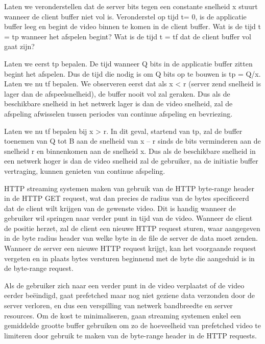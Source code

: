
\noindent Laten we veronderstellen dat de server bits tegen een constante snelheid x stuurt wanneer de client buffer niet vol is. Veronderstel op tijd t= 0, is de applicatie buffer leeg en begint de video binnen te komen in de client buffer. Wat is de tijd t = tp wanneer het afspelen begint? Wat is de tijd t = tf dat de client buffer vol gaat zijn?

\noindent Laten we eerst tp bepalen. De tijd wanneer Q bits in de applicatie buffer zitten begint het afspelen. Dus de tijd die nodig is om Q bits op te bouwen is tp = Q/x.
Laten we nu tf bepalen. We observeren eerst dat als x < r (server zend snelheid is lager dan de afspeelsnelheid), de buffer nooit vol zal geraken. Dus als de beschikbare snelheid in het netwerk lager is dan de video snelheid, zal de afspeling afwisselen tussen periodes van continue afspeling en bevriezing.

\noindent Laten we nu tf bepalen bij x > r. In dit geval, startend van tp, zal de buffer toenemen van Q tot B aan de snelheid van x – r sinds de bits verminderen aan de snelheid r en binnenkomen aan de snelheid x. Dus als de beschikbare snelheid in een netwerk hoger is dan de video snelheid zal de gebruiker, na de initiatie buffer vertraging, kunnen genieten van continue afspeling.




\noindent HTTP streaming systemen maken van gebruik van de HTTP byte-range header in de HTTP GET request, wat dan precies de radius van de bytes specificeerd dat de client wilt krijgen van de gewenste video. Dit is handig wanneer de gebruiker wil springen naar verder punt in tijd van de video. Wanneer de client de positie herzet, zal de client een nieuwe HTTP request sturen, waar aangegeven in de byte radius header van welke byte in de file de server de data moet zenden. Wanneer de server een nieuwe HTTP request krijgt, kan het voorgaande request vergeten en in plaats bytes versturen beginnend met de byte die aangeduid is in de byte-range request.

\noindent Als de gebruiker zich naar een verder punt in de video verplaatst of de video eerder beëindigd, gaat prefetched maar nog niet geziene data verzonden door de server verloren, en dus een verspilling van netwerk bandbreedte en server resources. Om de kost te minimaliseren, gaan streaming systemen enkel een gemiddelde grootte buffer gebruiken om zo de hoeveelheid van prefetched video te limiteren door gebruik te maken van de byte-range header in de HTTP requests.



